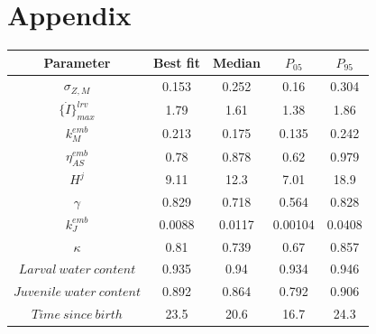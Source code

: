 \section{Appendix}

\begin{table}
    \begin{tabular}{ccccc}
    Parameter & Best fit & Median & $P_{05}$ & $P_{95}$\\
    \hline
    $\sigma_{Z,M}$ & 0.153 & 0.252 & 0.16 & 0.304\\
    $\{ \dot{I} \}_{max}^{lrv}$ & 1.79 & 1.61 & 1.38 & 1.86\\
    $k_M^{emb}$ & 0.213 & 0.175 & 0.135 & 0.242\\
    $\eta_{AS}^{emb}$ & 0.78 & 0.878 & 0.62 & 0.979\\
    $H^{j}$ & 9.11 & 12.3 & 7.01 & 18.9\\
    $\gamma$ & 0.829 & 0.718 & 0.564 & 0.828\\
    $k_J^{emb}$ & 0.0088 & 0.0117 & 0.00104 & 0.0408\\
    $\kappa$ & 0.81 & 0.739 & 0.67 & 0.857\\
    $Larval\ water\ content$ & 0.935 & 0.94 & 0.934 & 0.946\\
    $Juvenile\ water\ content$ & 0.892 & 0.864 & 0.792 & 0.906\\
    $Time\ since\ birth$ & 23.5 & 20.6 & 16.7 & 24.3\\
    \end{tabular}
\end{table}